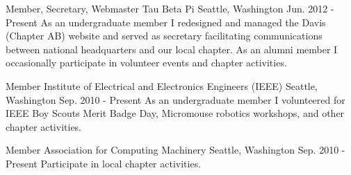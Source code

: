 

\begin{cventries}

\cventry
    {Member, Secretary, Webmaster} %
    {Tau Beta Pi} %
    {Seattle, Washington} %
    {Jun. 2012 - Present} %
    {As an undergraduate member I redesigned and managed the Davis (Chapter AB) website and served as secretary facilitating communications between national headquarters and our local chapter. As an alumni member I occasionally participate in volunteer events and chapter activities.} %
    {}

\cventry
    {Member} %
    {Institute of Electrical and Electronics Engineers (IEEE)} %
    {Seattle, Washington} %
    {Sep. 2010 - Present} %
    {As an undergraduate member I volunteered for IEEE Boy Scouts Merit Badge Day, Micromouse robotics workshops, and other chapter activities.} %
    {}

\cventry
    {Member} %
    {Association for Computing Machinery} %
    {Seattle, Washington} %
    {Sep. 2010 - Present} %
    {Participate in local chapter activities.} %
    {}


\end{cventries}
